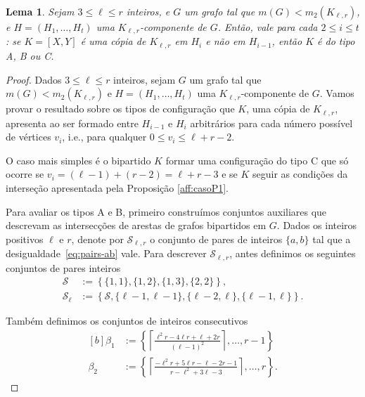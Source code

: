 \documentclass[12pt,a4paper]{book}
\newcommand{\K}{K_{\ell,r}} %
\newcommand{\Slr}{\mathcal{S}_{\ell,r}} %
\newtheorem{lema}      [teorema] {Lema}
\begin{document}
 \begin{lema}\label{lema:config}
        Sejam $3\leq \ell \leq r$ inteiros, e $G$ um grafo tal que $m(G) < m_2(\K)$, 
     e $H = (H_1, \ldots, H_t)$ uma $\K$-componente de $G$.  
    Então,  vale para cada $2\leq i \leq t$: 
    se $K = [X, Y]$ é uma cópia de $\K$ em
    $H_i$ e não em $H_{i-1}$, 
    então $K$ é do tipo A, B ou C.   
    \end{lema}
\begin{proof}
        Dados $3\leq \ell \leq r$ inteiros,
        sejam $G$ um grafo tal que $m(G) < m_2(\K)$ e
        $H = (H_1, \ldots, H_t)$ uma $\K$-componente de $G$.
        Vamos provar o resultado sobre os tipos de configuração que $K$, uma cópia de $\K$, apresenta ao ser formado entre $H_{i-1}$ e $H_i$ arbitrários para cada número possível de vértices $v_i$, i.e., 
        para qualquer $0 \leq v_i \leq \ell + r-2$. 
        
        O caso mais simples é o bipartido $K$ formar uma configuração do tipo C que só ocorre se 
     $v_i = (\ell-1)+(r-2) = \ell+r-3$ 
     e se $K$ seguir as condições da interseção apresentada pela Proposição \ref{aff:casoP1}.        
       
    Para avaliar os tipos A e B, primeiro construímos conjuntos auxiliares que descrevam as intersecções de arestas de grafos bipartidos em $G$.   
    Dados os inteiros positivos $\ell$ e $r$, denote por
    $\mathcal{S}_{\ell,r}$ o conjunto de pares de inteiros $\{a,b\}$ tal que a desigualdade~\ref{eq:pairs-ab} vale.  
    Para descrever $\Slr$, antes definimos os seguintes conjuntos de pares inteiros
    \begin{align}\label{eq:conjS} 
        \mathcal{S} &:= \left\{\{1,1\},\{1,2\},\{1,3\},\{2,2\}\right\},
    \\
    	\mathcal{S}_\ell &:=
    \left\{\mathcal{S},\{\ell-1,\ell-1\},\{\ell-2,\ell\},\{\ell-1,\ell\}\right\}.
    \end{align} 
        
    Também definimos os conjuntos de inteiros consecutivos 
    \begin{equation}
        \begin{aligned}[b]
                \beta_1 &:=
                \left\{\left\lceil \frac{\ell^2r - 4\ell r + \ell+2r}{(\ell-1)^2}\right\rceil,\dots, r-1\right\}   
                \\
                \beta_2 &:=
                \left\{\left\lceil \frac{-\ell^2r +5\ell r - \ell-2r-1}{r-\ell^2+3\ell-3}\right\rceil,\ldots, r\right\}.
            \end{aligned} 
        \label{eq:conjBeta}
    \end{equation}
    

\end{proof}
\end{document}
